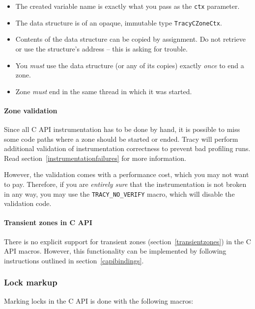 \documentclass[hidelinks,titlepage,a4paper,twoside]{article}
\begin{document}
\begin{itemize}
\item The created variable name is exactly what you pass as the \texttt{ctx} parameter.
\item The data structure is of an opaque, immutable type \texttt{TracyCZoneCtx}.
\item Contents of the data structure can be copied by assignment. Do not retrieve or use the structure's address -- this is asking for trouble.
\item You \emph{must} use the data structure (or any of its copies) exactly \emph{once} to end a zone.
\item Zone \emph{must} end in the same thread in which it was started.
\end{itemize}

\paragraph{Zone validation}

Since all C API instrumentation has to be done by hand, it is possible to miss some code paths where a zone should be started or ended. Tracy will perform additional validation of instrumentation correctness to prevent bad profiling runs. Read section~\ref{instrumentationfailures} for more information.

However, the validation comes with a performance cost, which you may not want to pay. Therefore, if you are \emph{entirely sure} that the instrumentation is not broken in any way, you may use the \texttt{TRACY\_NO\_VERIFY} macro, which will disable the validation code.

\paragraph{Transient zones in C API}

There is no explicit support for transient zones (section~\ref{transientzones}) in the C API macros. However, this functionality can be implemented by following instructions outlined in section~\ref{capibindings}.

\subsubsection{Lock markup}

Marking locks in the C API is done with the following macros:
\end{document}
